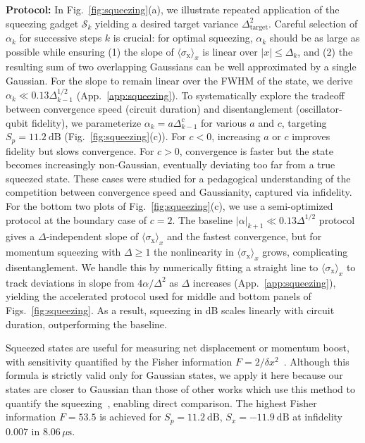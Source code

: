 \documentclass[aps,prx,showpacs,notitlepage,twocolumn,superscriptaddress,nofootinbib,preprintnumbers,floatfix,10pt, longbibliography]{revtex4-2}
\begin{document}
 
\par\textbf{Protocol:} In Fig.~\ref{fig:squeezing}(a), we illustrate repeated application of the
squeezing gadget $\mathcal{S}_k$ yielding a desired target variance
$\Delta_\mathrm{target}^2$.  Careful selection of $\alpha_k$ for successive
steps $k$ is crucial: for optimal squeezing, $\alpha_k$ should be as large
as possible while ensuring (1) the slope of $\langle\sigma_\mathrm{x}\rangle_x$
is linear over $|x|\le\Delta_k$, and (2) the resulting sum of two
overlapping Gaussians can be well approximated by a single Gaussian.  For
the slope to remain linear over the FWHM of the state, we derive
$\alpha_k\ll 0.13\Delta_{k-1}^{1/2}$ (App.~\ref{app:squeezing}).
To systematically explore the tradeoff between convergence speed (circuit
duration) and disentanglement (oscillator-qubit fidelity), we parameterize
$\alpha_k=a\Delta_{k-1}^c$ for various $a$ and $c$, targeting
$S_p=11.2\ \mathrm{dB}$ (Fig.~\ref{fig:squeezing}(c)).  For $c<0$,
increasing $a$ or $c$ improves fidelity but slows convergence.  For $c>0$,
convergence is faster but the state becomes increasingly non-Gaussian,
eventually deviating too far from a true squeezed state.  These cases were studied for a pedagogical understanding of the competition between convergence speed and Gaussianity, captured via infidelity. For the bottom two plots of Fig.~\ref{fig:squeezing}(c), we use a semi-optimized protocol at the boundary case of $c=2$. The baseline $|\alpha|_{k+1}\ll 0.13\Delta^{1/2}$ protocol gives a $\Delta$-independent slope of
$\langle\sigma_\mathrm{x}\rangle_x$ and the fastest convergence, but for
momentum squeezing with $\Delta\ge 1$ the nonlinearity in
$\langle\sigma_\mathrm{x}\rangle_x$ grows, complicating disentanglement.
We handle this by numerically fitting a straight line to
$\langle\sigma_\mathrm{x}\rangle_x$ to track deviations in slope from
$4\alpha/\Delta^2$ as $\Delta$ increases (App.~\ref{app:squeezing}), yielding
the accelerated protocol used for middle and bottom panels of Figs.~\ref{fig:squeezing}.  As a
result, squeezing in dB scales linearly with circuit duration,
outperforming the baseline.

Squeezed states are useful for measuring net displacement or momentum boost,
with sensitivity quantified by the Fisher information
$F=2/\delta x^2$~\cite{paris2004quantum}.  Although this formula is strictly
valid only for Gaussian states, we apply it here because our states are
closer to Gaussian than those of other
works which use this method to quantify the squeezing~\cite{hastrup2021unconditional,eickbusch2022fast}, enabling direct
comparison.  The highest Fisher information $F=53.5$ is achieved for
$S_p=11.2\ \mathrm{dB}$, $S_x=-11.9\ \mathrm{dB}$ at infidelity $0.007$
in $8.06\,\mu\mathrm{s}$.
\end{document}
